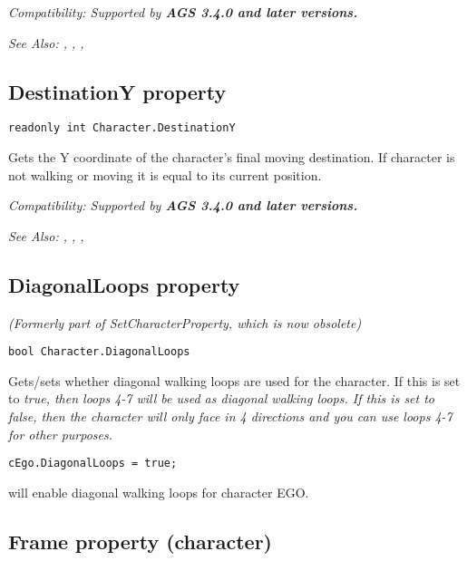 \it{Compatibility:} Supported by \bf{AGS 3.4.0} and later versions.

\it{See Also:} ,
,
,


\subsection{DestinationY property}\label{Character.DestinationY}%

\begin{verbatim}
readonly int Character.DestinationY
\end{verbatim}
Gets the Y coordinate of the character's final moving destination. If character is not walking
or moving it is equal to its current position.

\it{Compatibility:} Supported by \bf{AGS 3.4.0} and later versions.

\it{See Also:} ,
,
,


\subsection{DiagonalLoops property}\label{Character.DiagonalLoops}%

\it{(Formerly part of SetCharacterProperty, which is now obsolete)}

\begin{verbatim}
bool Character.DiagonalLoops
\end{verbatim}
Gets/sets whether diagonal walking loops are used for the character. If this is set
to \it{true}, then loops 4-7 will be used as diagonal walking loops. If this is set to
\it{false}, then the character will only face in 4 directions and you can use
loops 4-7 for other purposes.

\begin{verbatim}
cEgo.DiagonalLoops = true;
\end{verbatim}
will enable diagonal walking loops for character EGO.


\subsection{Frame property (character)}\label{Character.Frame}%

